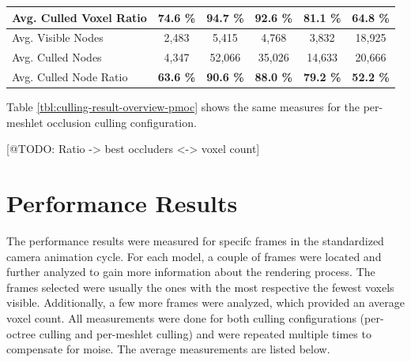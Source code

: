 \begin{table}[h]
\begin{tabular}{|lccccc|}
  \multicolumn{1}{|l|}{Avg. Culled Voxel Ratio}   & \multicolumn{1}{c|}{\textbf{74.6 \%}}         & \multicolumn{1}{c|}{\textbf{94.7 \%}}         & \multicolumn{1}{c|}{\textbf{92.6 \%}} & \multicolumn{1}{c|}{\textbf{81.1 \%}}     & \multicolumn{1}{c|}{\textbf{64.8 \%}}     \\ \hline
  \multicolumn{1}{|l|}{Avg. Visible Nodes}        & \multicolumn{1}{c|}{2,483}                    & \multicolumn{1}{c|}{5,415}                    & \multicolumn{1}{c|}{4,768}            & \multicolumn{1}{c|}{3,832}                & \multicolumn{1}{c|}{18,925}               \\
  \multicolumn{1}{|l|}{Avg. Culled Nodes}         & \multicolumn{1}{c|}{4,347}                    & \multicolumn{1}{c|}{52,066}                   & \multicolumn{1}{c|}{35,026}           & \multicolumn{1}{c|}{14,633}               & \multicolumn{1}{c|}{20,666}               \\
  \multicolumn{1}{|l|}{Avg. Culled Node Ratio}    & \multicolumn{1}{c|}{\textbf{63.6 \%}}         & \multicolumn{1}{c|}{\textbf{90.6 \%}}         & \multicolumn{1}{c|}{\textbf{88.0 \%}} & \multicolumn{1}{c|}{\textbf{79.2 \%}}     & \multicolumn{1}{c|}{\textbf{52.2 \%}}     \\ \hline
  
  \end{tabular}
\end{table}


\noindent
Table \ref{tbl:culling-result-overview-pmoc} shows the same measures for the per-meshlet occlusion culling 
configuration. 









[@TODO: Ratio -> best occluders <-> voxel count]




\section{Performance Results}

The performance results were measured for specifc frames in the standardized camera animation cycle. For each 
model, a couple of frames were located and further analyzed to gain more information about the rendering 
process. The frames selected were usually the ones with the most respective the fewest voxels visible. Additionally,
a few more frames were analyzed, which provided an average voxel count. All measurements were done for both 
culling configurations (per-octree culling and per-meshlet culling) and were repeated multiple times to compensate 
for moise. The average measurements are listed below. \\

